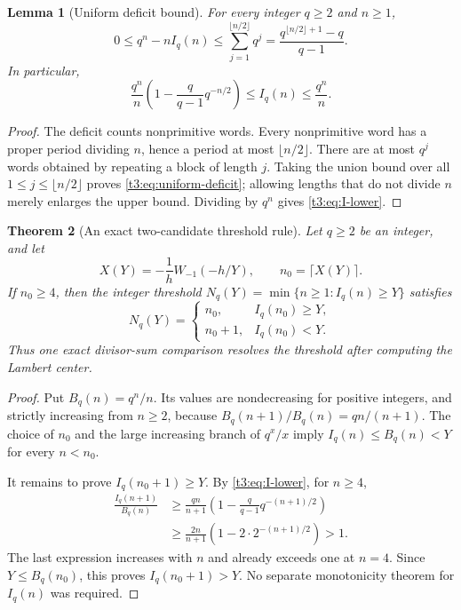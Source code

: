 \documentclass[11pt,openany]{book}
\numberwithin{equation}{chapter}
\theoremstyle{plain}
\newtheorem{theorem}{Theorem}[chapter]
\newtheorem{lemma}[theorem]{Lemma}
\theoremstyle{definition}
\theoremstyle{remark}
\begin{document}
\begin{lemma}[Uniform deficit bound]\label{t3:lem:irreducible-bound}
For every integer $q\ge2$ and $n\ge1$,
\begin{equation}\label{t3:eq:uniform-deficit}
 0\le q^n-nI_q(n)
 \le\sum_{j=1}^{\lfloor n/2\rfloor}q^j
 =\frac{q^{\lfloor n/2\rfloor+1}-q}{q-1}.
\end{equation}
In particular,
\begin{equation}\label{t3:eq:I-lower}
 \frac{q^n}{n}\left(1-\frac q{q-1}q^{-n/2}\right)
 \le I_q(n)\le\frac{q^n}{n}.
\end{equation}
\end{lemma}
\begin{proof}
The deficit counts nonprimitive words. Every nonprimitive word has a proper period dividing $n$, hence a period at most $\lfloor n/2\rfloor$. There are at most $q^j$ words obtained by repeating a block of length $j$. Taking the union bound over all $1\le j\le\lfloor n/2\rfloor$ proves \eqref{t3:eq:uniform-deficit}; allowing lengths that do not divide $n$ merely enlarges the upper bound. Dividing by $q^n$ gives \eqref{t3:eq:I-lower}.
\end{proof}

\begin{theorem}[An exact two-candidate threshold rule]\label{t3:thm:two-candidate}
Let $q\ge2$ be an integer, and let
\[
 X(Y)=-\frac1hW_{-1}(-h/Y),\qquad n_0=\lceil X(Y)\rceil.
\]
If $n_0\ge4$, then the integer threshold
$N_q(Y)=\min\{n\ge1:I_q(n)\ge Y\}$ satisfies
\begin{equation}\label{t3:eq:two-candidate}
 \boxed{\displaystyle
 N_q(Y)=
 \begin{cases}
 n_0,&I_q(n_0)\ge Y,\\
 n_0+1,&I_q(n_0)<Y.
 \end{cases}}
\end{equation}
Thus one exact divisor-sum comparison resolves the threshold after computing the Lambert center.
\end{theorem}
\begin{proof}
Put $B_q(n)=q^n/n$. Its values are nondecreasing for positive integers, and strictly increasing from $n\ge2$, because
$B_q(n+1)/B_q(n)=qn/(n+1)$. The choice of $n_0$ and the large increasing branch of $q^x/x$ imply
$I_q(n)\le B_q(n)<Y$ for every $n<n_0$.

It remains to prove $I_q(n_0+1)\ge Y$. By \eqref{t3:eq:I-lower}, for $n\ge4$,
\begin{align*}
 \frac{I_q(n+1)}{B_q(n)}
 &\ge\frac{qn}{n+1}
   \left(1-\frac q{q-1}q^{-(n+1)/2}\right)\\
 &\ge\frac{2n}{n+1}\left(1-2\cdot2^{-(n+1)/2}\right)>1.
\end{align*}
The last expression increases with $n$ and already exceeds one at $n=4$.
Since $Y\le B_q(n_0)$, this proves $I_q(n_0+1)>Y$. No separate monotonicity theorem for $I_q(n)$ was required.
\end{proof}
\end{document}

